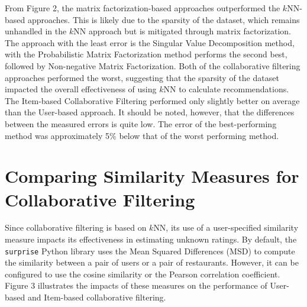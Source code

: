 \documentclass[11pt]{article}
\begin{document}
From Figure 2, the matrix factorization-based approaches outperformed the $k$NN-based approaches.
This is likely due to the sparsity of the dataset, which remains unhandled in the $k$NN approach but is mitigated through matrix factorization.
The approach with the least error is the Singular Value Decomposition method, with the Probabilistic Matrix Factorization method performs the second best, followed by Non-negative Matrix Factorization.
Both of the collaborative filtering approaches performed the worst, suggesting that the sparsity of the dataset impacted the overall effectiveness of using $k$NN to calculate recommendations.
The Item-based Collaborative Filtering performed only slightly better on average than the User-based approach.
It should be noted, however, that the differences between the measured errors is quite low.
The error of the best-performing method was approximately 5\% below that of the worst performing method.




\section{Comparing Similarity Measures for Collaborative Filtering}

Since collaborative filtering is based on $k$NN, its use of a user-specified similarity measure impacts its effectiveness in estimating unknown ratings.
By default, the \texttt{surprise} Python library uses the Mean Squared Differences (MSD) to compute the similarity between a pair of users or a pair of restaurants.
However, it can be configured to use the cosine similarity or the Pearson correlation coefficient.
Figure 3 illustrates the impacts of these measures on the performance of User-based and Item-based collaborative filtering.
\end{document}
